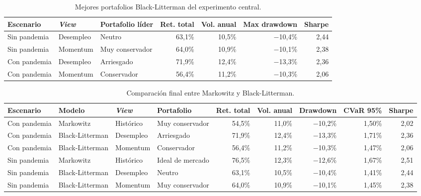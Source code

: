 \begin{table}[H]
\centering
\caption{Mejores portafolios Black-Litterman del experimento central.}
\label{tab:anexo4_bl_mejores}
\scriptsize
\begin{adjustbox}{max width=\textwidth}
\begin{tabular}{@{}lllrrrr@{}}
\toprule
Escenario & \textit{View} & Portafolio l\'ider & Ret. total & Vol. anual & Max drawdown & Sharpe \\
\midrule
Sin pandemia & Desempleo & Neutro & 63,1\% & 10,5\% & $-$10,4\% & 2,44 \\
Sin pandemia & Momentum & Muy conservador & 64,0\% & 10,9\% & $-$10,1\% & 2,38 \\
Con pandemia & Desempleo & Arriesgado & 71,9\% & 12,4\% & $-$13,3\% & 2,36 \\
Con pandemia & Momentum & Conservador & 56,4\% & 11,2\% & $-$10,3\% & 2,06 \\
\bottomrule
\end{tabular}
\end{adjustbox}
\end{table}

\begin{table}[H]
\centering
\caption{Comparaci\'on final entre Markowitz y Black-Litterman.}
\label{tab:anexo4_bl_comparacion_final}
\scriptsize
\begin{adjustbox}{max width=\textwidth}
\begin{tabular}{@{}llllrrrrr@{}}
\toprule
Escenario & Modelo & \textit{View} & Portafolio & Ret. total & Vol. anual & Drawdown & CVaR 95\% & Sharpe \\
\midrule
Con pandemia & Markowitz & Hist\'orico & Muy conservador & 54,5\% & 11,0\% & $-$10,2\% & 1,50\% & 2,02 \\
Con pandemia & Black-Litterman & Desempleo & Arriesgado & 71,9\% & 12,4\% & $-$13,3\% & 1,71\% & 2,36 \\
Con pandemia & Black-Litterman & Momentum & Conservador & 56,4\% & 11,2\% & $-$10,3\% & 1,47\% & 2,06 \\
Sin pandemia & Markowitz & Hist\'orico & Ideal de mercado & 76,5\% & 12,3\% & $-$12,6\% & 1,67\% & 2,51 \\
Sin pandemia & Black-Litterman & Desempleo & Neutro & 63,1\% & 10,5\% & $-$10,4\% & 1,41\% & 2,44 \\
Sin pandemia & Black-Litterman & Momentum & Muy conservador & 64,0\% & 10,9\% & $-$10,1\% & 1,45\% & 2,38 \\
\bottomrule
\end{tabular}
\end{adjustbox}
\end{table}

